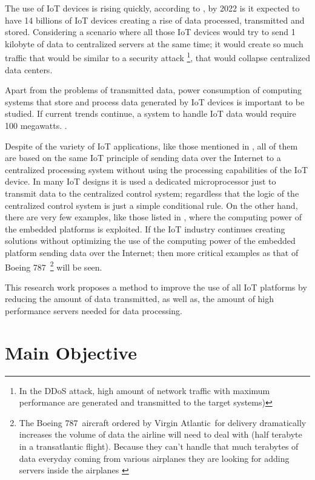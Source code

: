 The use of IoT devices is rising quickly, according to \cite{Benkhelifa}, by
2022 is it expected to have 14 billions of IoT devices creating a rise of
data processed, transmitted and stored. Considering a scenario where all those IoT
devices would try to send 1 kilobyte of data to centralized servers at the same
time; it would create so much traffic that would be similar to a security
attack \footnote{ In the DDoS attack, high amount of network traffic with
maximum performance are generated and transmitted  to the target
systems\cite{Yang})}, that would collapse centralized data centers.

Apart from the problems of transmitted data, power consumption of
computing systems that store and process data generated by IoT devices
is important to be studied. If current trends continue, a system to handle
IoT data would require 100 megawatts. \cite{Xizhou}. 

Despite of the variety of IoT applications, like those mentioned in
\cite{Liu-Dan} \cite{Du}, all of them are based on the same IoT principle of
sending data over the Internet to a centralized processing system without using
the processing capabilities of the IoT device.  In many IoT designs \cite{Du}
it is used a dedicated microprocessor just to transmit data to the centralized
control system; regardless that the logic of the centralized control system is
just a simple conditional rule. On the other hand, there are very few examples,
like those listed in \cite{Wun}, where the computing power of the embedded
platforms is exploited. If the IoT industry continues creating solutions
without optimizing the use of the computing power of the embedded platform
sending data over the Internet; then more critical examples as that of Boeing
787\textregistered\  \footnote{ The Boeing 787\textregistered\ aircraft ordered
by Virgin Atlantic\textregistered\  for delivery dramatically increases the
volume of data the airline will need to deal with (half terabyte in a
transatlantic flight). Because they can't handle that much terabytes of data
everyday coming from various airplanes they are looking for adding servers
inside the airplanes \cite{Virgin}} will be seen.

This research work proposes a method to improve the use of all IoT platforms by
reducing the amount of data transmitted, as well as, the amount of high
performance servers needed for data processing. 


\section{Main Objective} \noindent

